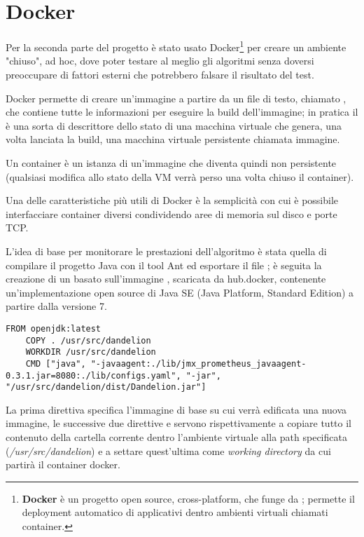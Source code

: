 \section{Docker}
Per la seconda parte del progetto è stato usato Docker\footnote{
    \textbf{Docker}\cite{docker} è un progetto open source, cross-platform, che funge da ; 
    permette il deployment automatico di applicativi dentro ambienti virtuali chiamati container.
} per creare un ambiente "chiuso", ad hoc, dove poter testare al meglio gli algoritmi senza doversi preoccupare di fattori esterni che potrebbero falsare 
il risultato del test. 

Docker permette di creare un'immagine a partire da un file di testo, chiamato , che contiene tutte le informazioni per eseguire la build dell'immagine; 
in pratica il  è una sorta di descrittore dello stato di una macchina virtuale che genera, una volta lanciata la build, una macchina virtuale persistente chiamata immagine. 

Un container è un istanza di un'immagine che diventa quindi non persistente (qualsiasi modifica allo stato della VM verrà perso una volta chiuso il container). 

Una delle caratteristiche più utili di Docker è la semplicità con cui è possibile interfacciare container diversi condividendo aree di memoria sul disco e porte TCP.

L'idea di base per monitorare le prestazioni dell'algoritmo è stata quella di compilare il progetto Java con il tool Ant\cite{ant} ed esportare il file ; 
è seguita la creazione di un  basato sull'immagine \cite{open-jdk}, 
scaricata da hub.docker\cite{hub-docker}, contenente un'implementazione open source di Java SE (Java Platform, Standard Edition) a partire dalla versione 7. 

\begin{lstlisting}[style=YmlStyle, caption=Dockerfile]
    FROM openjdk:latest
    COPY . /usr/src/dandelion
    WORKDIR /usr/src/dandelion
    CMD ["java", "-javaagent:./lib/jmx_prometheus_javaagent-0.3.1.jar=8080:./lib/configs.yaml", "-jar", "/usr/src/dandelion/dist/Dandelion.jar"]
\end{lstlisting}

La prima direttiva  specifica l'immagine di base su cui verrà edificata una nuova immagine, le successive due direttive  e  servono rispettivamente a copiare 
tutto il contenuto della cartella corrente dentro l'ambiente virtuale alla path specificata (\textit{/usr/src/dandelion}) e a settare quest'ultima come \textit{working directory} da cui 
partirà il container docker. 

